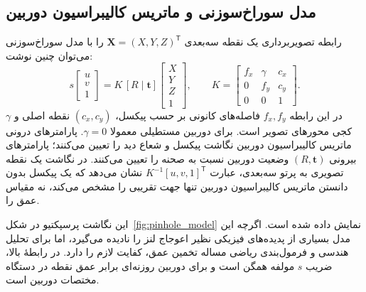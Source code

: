 \subsection{مدل سوراخ‌سوزنی و ماتریس کالیبراسیون دوربین}
رابطه تصویربرداری یک نقطه سه‌بعدی $\mathbf X=(X,Y,Z)^\mathsf T$ را با مدل سوراخ‌سوزنی می‌توان چنین نوشت:
\begin{equation}
 s\begin{bmatrix}u\\v\\1\end{bmatrix}=K\,[R\mid\mathbf t]
 \begin{bmatrix}X\\Y\\Z\\1\end{bmatrix},\qquad
 K=\begin{bmatrix}f_x&\gamma&c_x\\0&f_y&c_y\\0&0&1\end{bmatrix}.
\end{equation}
در این رابطه $f_x,f_y$ فاصله‌های کانونی بر حسب پیکسل، $(c_x,c_y)$ نقطه اصلی و $\gamma$ کجی محورهای تصویر است. برای دوربین مستطیلی معمولا $\gamma=0$. پارامترهای درونی ماتریس کالیبراسیون دوربین نگاشت پیکسل و شعاع دید را تعیین می‌کنند؛ پارامترهای بیرونی $(R,\mathbf t)$ وضعیت دوربین نسبت به صحنه را تعیین می‌کنند. در نگاشت یک نقطه تصویری به پرتو سه‌بعدی، عبارت $K^{-1}[u,v,1]^\mathsf T$ نشان می‌دهد که یک پیکسل بدون دانستن ماتریس کالیبراسیون دوربین تنها جهت تقریبی را مشخص می‌کند، نه مقیاس عمق را.

این نگاشت پرسپکتیو در شکل{~\ref{fig:pinhole_model}} نمایش داده شده است. اگرچه این مدل بسیاری از پدیده‌های فیزیکی نظیر اعوجاج لنز را نادیده می‌گیرد، اما برای تحلیل هندسی و فرمول‌بندی ریاضی مساله تخمین عمق، کفایت لازم را دارد. در رابطهٔ بالا، ضریب {$s$} مولفه همگن است و برای دوربین روزنه‌ای برابر عمق نقطه در دستگاه مختصات دوربین است.

